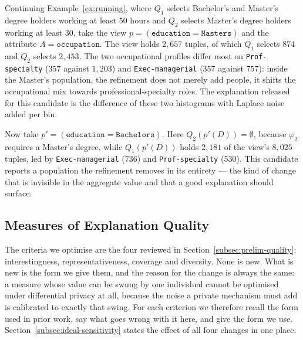 \begin{example}
\label{ex:candidate}
Continuing Example~\ref{ex:running}, where $Q_1$ selects Bachelor's and Master's degree holders working at least $50$ hours and $Q_2$ selects Master's degree holders working at least $30$, take the view $p=(\texttt{education}=\texttt{Masters})$ and the attribute $A=\texttt{occupation}$.
The view holds $2{,}657$ tuples, of which $Q_1$ selects $874$ and $Q_2$ selects $2{,}453$.
The two occupational profiles differ most on \texttt{Prof-specialty} ($357$ against $1{,}203$) and \texttt{Exec-managerial} ($357$ against $757$): inside the Master's population, the refinement does not merely add people, it shifts the occupational mix towards professional-specialty roles.
The explanation released for this candidate is the difference of these two histograms with Laplace noise added per bin.

Now take $p'=(\texttt{education}=\texttt{Bachelors})$.
Here $Q_2(p'(D))=\emptyset$, because $\varphi_2$ requires a Master's degree, while $Q_1(p'(D))$ holds $2{,}181$ of the view's $8{,}025$ tuples, led by \texttt{Exec-managerial} ($736$) and \texttt{Prof-specialty} ($530$).
This candidate reports a population the refinement removes in its entirety --- the kind of change that is invisible in the aggregate value and that a good explanation should surface.
\end{example}

\subsection{Measures of Explanation Quality}
\label{sec:explanation-quality}

The criteria we optimise are the four reviewed in Section~\ref{subsec:prelim-quality}: interestingness, representativeness, coverage and diversity.
None is new.
What is new is the form we give them, and the reason for the change is always the same: a measure whose value can be swung by one individual cannot be optimised under differential privacy at all, because the noise a private mechanism must add is calibrated to exactly that swing.
For each criterion we therefore recall the form used in prior work, say what goes wrong with it here, and give the form we use.
Section~\ref{subsec:ideal-sensitivity} states the effect of all four changes in one place.

